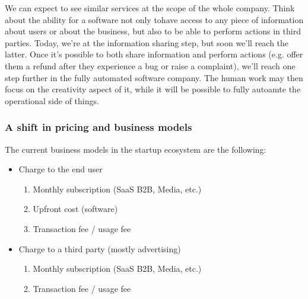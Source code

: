 \documentclass[12pt]{article}
\begin{document}
{\smallskip

We can expect to see similar services at the scope of the whole company. Think
about the ability for a software not only tohave access to any piece of
information about users or about the business, but also to be able to perform
actions in third parties. Today, we're at the information sharing step, but soon
we'll reach the latter.
Once it's possible to both share information and perform actions (e.g. offer
them a refund after they experience a bug or raise a complaint), we'll reach one
step further in the fully automated software company.
The human work may then focus on the creativity aspect of it, while it will be
possible to fully autoamte the operational side of things.

\subsubsection{A shift in pricing and business models}
The current business models in the startup ecosystem are the following:
\begin{itemize}
  \item Charge to the end user
  \begin{enumerate}
    \item Monthly subscription (SaaS B2B, Media, etc.)
    \item Upfront cost (software)
    \item Transaction fee / usage fee
  \end{enumerate}
  \item Charge to a third party (mostly advertising)
  \begin{enumerate}
    \item Monthly subscription (SaaS B2B, Media, etc.)
    \item Transaction fee / usage fee
  \end{enumerate}
\end{itemize}

}
\end{document}
